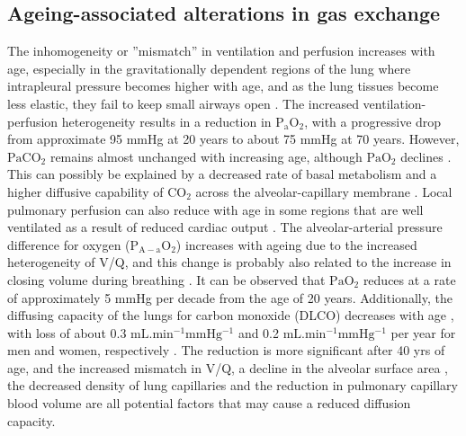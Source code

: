 \subsection{Ageing-associated alterations in gas exchange}
The inhomogeneity or ''mismatch'' in ventilation and perfusion increases with age, especially in the gravitationally dependent regions of the lung where intrapleural pressure becomes higher with age, and as the lung tissues become less elastic, they fail to keep small airways open \citep{holland1968regional, paoletti1985reference, lalley2013aging}. The increased ventilation-perfusion heterogeneity results in a reduction in $\mathrm{P_a O_2}$, with a progressive drop from approximate 95 mmHg at 20 years to about 75 mmHg at 70 years. However, $\mathrm{Pa CO_2}$ remains almost unchanged with increasing age, although $\mathrm{Pa O_2}$ declines \citep{wahba1983influence, sprung2006age}. This can possibly be explained by a decreased rate of basal metabolism and a higher diffusive capability of $\mathrm{CO_2}$ across the alveolar-capillary membrane \citep{ levitzky1984effects}. Local pulmonary perfusion can also reduce with age in some regions that are well ventilated as a result of reduced cardiac output \citep{levitzky1984effects,lalley2013aging}. The alveolar-arterial pressure difference for oxygen ($\mathrm{P_{A-a} O_2}$) increases with ageing due to the increased heterogeneity of V/Q, and this change is probably also related to the increase in closing volume during breathing \citep{janssens1999physiological}. It can be observed that $\mathrm{PaO_2}$ reduces at a rate of approximately 5 mmHg per decade from the age of 20 years. Additionally, the diffusing capacity of the lungs for carbon monoxide (DLCO) decreases with age \citep{guenard1996pulmonary}, with loss of about 0.3 $\mathrm{mL.min^{-1}mmHg^{-1}}$ and 0.2 $\mathrm{mL.min^{-1}mmHg^{-1}}$ per year for men and women, respectively \citep{murray1986normal}. The reduction is more significant after 40 yrs of age, and the increased mismatch in V/Q, a decline in the alveolar surface area \citep{verbeken1992senile, thurlbeck1975growth}, the decreased density of lung capillaries \citep{butler1970capillary} and the reduction in pulmonary capillary blood volume \citep{guenard1996pulmonary} are all potential factors that may cause a reduced diffusion capacity.

